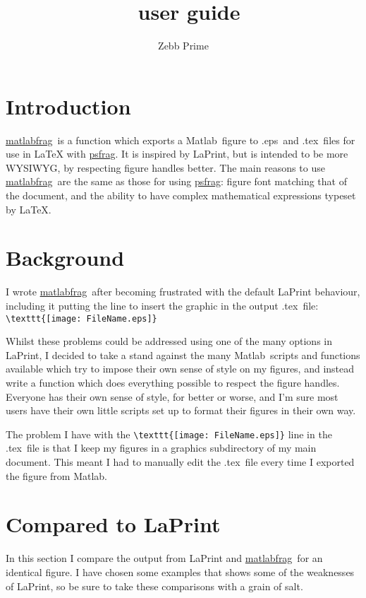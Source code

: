 \documentclass[a4paper,11pt]{article}
\title{\matlabfrag\ user guide}
\author{Zebb Prime}
\newcommand\matlabfrag{\texorpdfstring{\href{http://www.mathworks.com/matlabcentral/fileexchange/21286}{{\ttfamily matlabfrag}}}{matlabfrag}}
\newcommand\psfragname{\texorpdfstring{\href{http://www.ctan.org/tex-archive/help/Catalogue/entries/psfrag.html}{{\ttfamily psfrag}}}{psfrag}}
\newcommand\matlab{\texorpdfstring{{\sc Matlab}}{Matlab}}
\newcommand\tex{\texorpdfstring{{\sc .tex}}{.tex}}
\newcommand\eps{\texorpdfstring{{\sc .eps}}{.eps}}
\begin{document}
  \maketitle
  \tableofcontents
  \section{Introduction}%
    \matlabfrag\ is a function which exports a \matlab\ figure to \eps\ and \tex\ files for use in LaTeX
    with \psfragname. It is inspired by LaPrint, but is intended to be more WYSIWYG, by respecting figure
    handles better. The main reasons to use \matlabfrag\ are the same as those for using \psfragname: figure
    font matching that of the document, and the ability to have complex mathematical expressions typeset
    by LaTeX.
 
  \section{Background}%
    I wrote \matlabfrag\ after becoming frustrated with the default LaPrint behaviour, including it
    putting the line to insert the graphic in the output \tex\ file: \verb|\texttt{[image: FileName.eps]}|
    
    Whilst these problems could be addressed using one of the many options in LaPrint, I decided to
    take a stand against the many \matlab{}ripts and functions available which try to impose their
    own sense of style on my figures, and instead write a function which does everything possible to
    respect the figure handles. Everyone has their own sense of style, for better or worse, and I'm sure
    most users have their own little scripts set up to format their figures in their own way.
        
    The problem I have with the \verb|\texttt{[image: FileName.eps]}| line in the \tex\
    file is that I keep my figures in a {\ttfamily graphics} subdirectory of my main document. This meant I had to
    manually edit the \tex\ file every time I exported the figure from \matlab.
    
  \section{Compared to LaPrint}%
    In this section I compare the output from {\ttfamily LaPrint} and \matlabfrag\ for an identical
    figure. I have chosen some examples that shows some of the weaknesses of {\ttfamily LaPrint}, so
    be sure to take these comparisons with a grain of salt.
    
\end{document}
